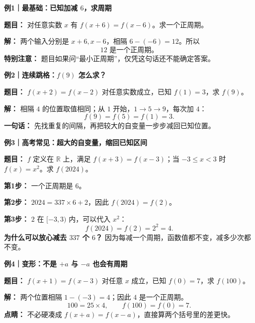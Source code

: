 \clearpage
\begin{examplebox}
\textbf{\textcolor{CExample}{例1｜最基础：已知加减 $6$，求周期}}



\textbf{题目：} 对任意实数 $x$ 有 $f(x+6)=f(x-6)$。求一个正周期。

\textbf{解：} 两个输入分别是 $x+6,x-6$，相隔 $6-(-6)=12$。所以
\[
\boxed{12\text{ 是一个正周期。}}
\]
\textbf{特别注意：} 题目如果问“最小正周期”，仅凭这句话还不能确定答案。

\medskip

\end{examplebox}
\clearpage
\begin{examplebox}
\textbf{\textcolor{CExample}{例2｜连续跳格：$f(9)$ 怎么求？}}



\textbf{题目：} $f(x+2)=f(x-2)$ 对任意实数成立，已知 $f(1)=3$，求 $f(9)$。

\textbf{解：} 相隔 $4$ 的位置取值相同；从 $1$ 开始，$1\to5\to9$，每次加 $4$：
\[
f(9)=f(5)=f(1)=\boxed{3}.
\]
\textbf{一句话：} 先找重复的间隔，再把较大的自变量一步步减回已知位置。

\medskip

\end{examplebox}
\clearpage
\begin{examplebox}
\textbf{\textcolor{CExample}{例3｜高考常见：超大的自变量，缩回已知区间}}



\textbf{题目：} $f$ 定义在 $\mathbb R$ 上，满足 $f(x+3)=f(x-3)$；当 $-3\le x<3$ 时 $f(x)=x^2$。求 $f(2024)$。

\textbf{第1步：} 一个正周期是 $6$。

\textbf{第2步：} $2024=337\times6+2$，因此 $f(2024)=f(2)$。

\textbf{第3步：} $2$ 在 $[-3,3)$ 内，可以代入 $x^2$：
\[
f(2024)=f(2)=2^2=\boxed{4}.
\]
\textbf{为什么可以放心减去 $337$ 个 $6$？} 因为每减一个周期，函数值都不变，减多少次都不变。

\medskip

\end{examplebox}
\clearpage
\begin{examplebox}
\textbf{\textcolor{CExample}{例4｜变形：不是 $+a$ 与 $-a$ 也会有周期}}



\textbf{题目：} $f(x+1)=f(x-3)$ 对任意 $x$ 成立，已知 $f(0)=7$，求 $f(100)$。

\textbf{解：} 两个位置相隔 $1-(-3)=4$；因此 $4$ 是一个正周期。
\[
100=25\times4,\qquad f(100)=f(0)=\boxed{7}.
\]
\textbf{点睛：} 不必硬凑成 $f(x+a)=f(x-a)$，直接算两个括号里的差更快。

\medskip

\end{examplebox}
